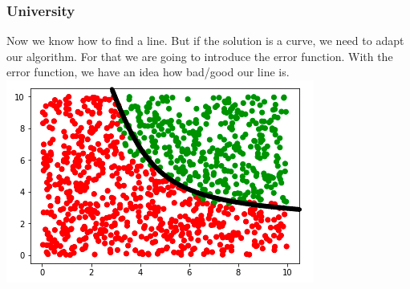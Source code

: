 \begin{frame}[fragile]
  \frametitle{University}
  Now we know how to find a line. But if the solution is a curve, we need to adapt our
  algorithm. For that we are going to introduce the error function. With the error
  function, we have an idea how bad/good our line is.\\
  \vspace{3mm}
  \includegraphics[scale=0.4]{img/uni_data_1}\\
  \vspace{3mm}
\end{frame}

